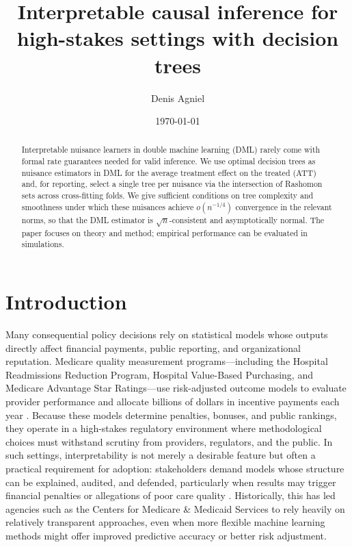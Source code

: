 \documentclass[12pt]{article}
\title{Interpretable causal inference for high-stakes settings with decision trees}
\author{Denis Agniel}
\date{\today}
\begin{document}
\maketitle

\begin{abstract}
    
Interpretable nuisance learners in double machine learning (DML) rarely come with formal rate guarantees needed for valid inference. We use optimal decision trees as nuisance estimators in DML for the average treatment effect on the treated (ATT) and, for reporting, select a single tree per nuisance via the intersection of Rashomon sets across cross-fitting folds. We give sufficient conditions on tree complexity and smoothness under which these nuisances achieve $o(n^{-1/4})$ convergence in the relevant norms, so that the DML estimator is $\sqrt{n}$-consistent and asymptotically normal. The paper focuses on theory and method; empirical performance can be evaluated in simulations.
\end{abstract}

\section{Introduction}

Many consequential policy decisions rely on statistical models whose outputs directly affect financial payments, public reporting, and organizational reputation. Medicare quality measurement programs---including the Hospital Readmissions Reduction Program, Hospital Value-Based Purchasing, and Medicare Advantage Star Ratings---use risk-adjusted outcome models to evaluate provider performance and allocate billions of dollars in incentive payments each year \citep{cms_quality}. Because these models determine penalties, bonuses, and public rankings, they operate in a high-stakes regulatory environment where methodological choices must withstand scrutiny from providers, regulators, and the public. In such settings, interpretability is not merely a desirable feature but often a practical requirement for adoption: stakeholders demand models whose structure can be explained, audited, and defended, particularly when results may trigger financial penalties or allegations of poor care quality \citep{obermeyer2019, rajkomar2019, rudin2019}. Historically, this has led agencies such as the Centers for Medicare \& Medicaid Services to rely heavily on relatively transparent approaches, even when more flexible machine learning methods might offer improved predictive accuracy or better risk adjustment.
\end{document}
